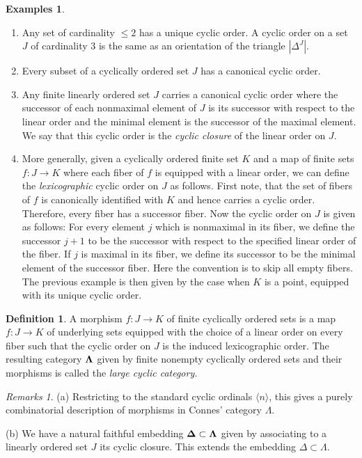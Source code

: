 \documentclass[english,11pt,leqno]{article}
\def\cn{\langle n \rangle}
\def\cn{\langle n \rangle}
\theoremstyle{definition}
\newtheorem{defi}[thm]{Definition}
\newtheorem{exas}[thm]{Examples}
\theoremstyle{remark}
\newtheorem{rems}[thm]{Remarks}
\numberwithin{equation}{section}
\begin{document}
\begin{exas}
	\begin{enumerate} 
		\item Any set of cardinality $\le 2$ has a unique cyclic order. A cyclic order on a
			set $J$ of cardinality $3$ is the same as an orientation of the triangle
			$|\Delta^J|$.
		\item Every subset of a cyclically ordered set $J$ has a canonical cyclic order.
		\item Any finite linearly ordered set $J$ carries a canonical cyclic order where the
			successor of each nonmaximal element of $J$ is its successor with respect to the linear
			order and the minimal element is the successor of the maximal element. We
			say that this cyclic order is the {\em cyclic closure} of the linear order on $J$.
		\item More generally, given a cyclically ordered finite set $K$ and a map of finite sets $f: J \to
			K$ where each fiber of $f$ is equipped with a linear order, we can define
			the {\em lexicographic} cyclic order on $J$ as follows. First note, that the
			set of fibers of $f$ is canonically identified with $K$ and hence carries a
			cyclic order. Therefore, every fiber has a successor fiber. Now the cyclic
			order on $J$ is given as follows: For every element $j$ which is nonmaximal
			in its fiber, we define the successor $j +1$ to be the
			successor with respect to the specified linear order of the fiber. If $j$ is
			maximal in its fiber, we define its successor to be the minimal element of
			the successor fiber. Here the convention is to skip all empty fibers. The
			previous example is then given by the case when $K$ is a point, equipped
			with its unique cyclic order.
	\end{enumerate}
\end{exas}

\begin{defi} A morphism $f: J \to K$ of finite cyclically ordered sets is a map $f: J \to K$ of underlying sets
	equipped with the choice of a linear order on every fiber such that the cyclic order on $J$
	is the induced lexicographic order. The resulting category ${\bf \Lambda}$ 
	given by finite nonempty cyclically ordered sets and their morphisms is called the {\em large cyclic
	category.}
\end{defi}

\begin{rems} (a) Restricting to the standard cyclic ordinals $\cn$, this gives a purely  combinatorial description
of morphisms in Connes' category $\Lambda$. 

(b) We have a natural faithful embedding ${\bf \Delta} \subset {\bf \Lambda}$ given by
	associating to a linearly ordered set $J$ its cyclic closure. This extends the embedding $\Delta\subset\Lambda$. 
\end{rems}
\end{document}
